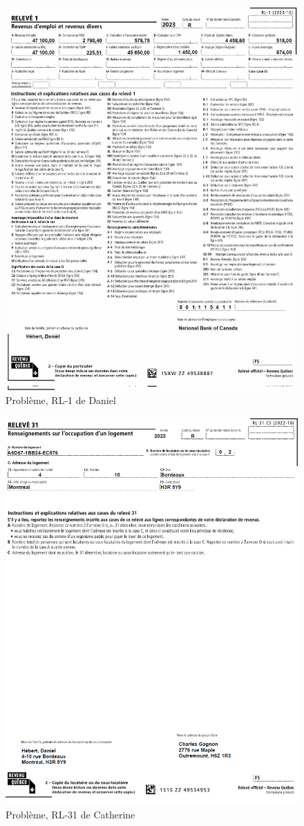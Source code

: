 \begin{figure}
	\centering
	\includegraphics[width=.9\textwidth]{probleme/chapitre-4/Daniel-RL1.png}
	\caption[]{Problème, RL-1 de Daniel}
	\label{fig:chap4ProblemeDanielRL1}
\end{figure}
\begin{figure}
	\centering
	\includegraphics[width=.9\textwidth]{probleme/chapitre-4/Daniel-RL31.png}
	\caption[]{Problème, RL-31 de Catherine}
	\label{fig:chap4ProblemeCatherineRL31}
\end{figure}

